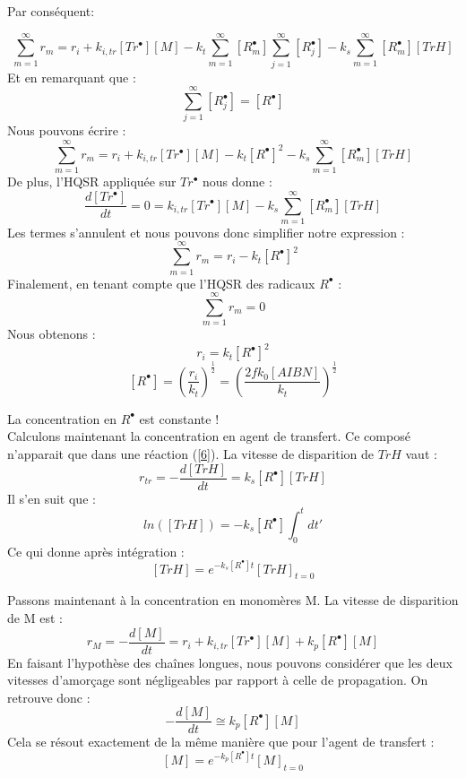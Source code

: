 \documentclass[a4paper,oneside,12pt]{article}
\begin{document}
Par conséquent:

$$\sum\limits_{m=1}^\infty r_{m}=r_i+ k_{i,tr}[Tr^{\bullet}][M] -k_{t}\sum\limits_{m=1}^\infty [R_m^{\bullet}] \sum\limits_{j=1}^\infty[R_j^{\bullet}]-k_{s}\sum\limits_{m=1}^\infty[R_{m}^{\bullet}][TrH]$$
Et en remarquant que :
$$\sum\limits_{j=1}^\infty[R_j^{\bullet}] = [R^{\bullet}]$$
Nous pouvons écrire :
$$\sum\limits_{m=1}^\infty r_{m}=r_i+ k_{i,tr}[Tr^{\bullet}][M] -k_{t}[R^{\bullet}]^2-k_{s}\sum\limits_{m=1}^\infty[R_{m}^{\bullet}][TrH]$$
De plus, l'HQSR appliquée sur $Tr^{\bullet}$ nous donne :
$$\frac{d[Tr^{\bullet}]}{dt}=0=k_{i,tr}[Tr^{\bullet}][M]-k_{s}\sum\limits_{m=1}^\infty[R_{m}^{\bullet}][TrH]$$
Les termes s'annulent et nous pouvons donc simplifier notre expression :
$$\sum\limits_{m=1}^\infty r_{m}=r_i-k_{t}[R^{\bullet}]^2$$
Finalement, en tenant compte que l'HQSR des radicaux $R^{\bullet}$ :
$$\sum\limits_{m=1}^\infty r_{m}=0$$
Nous obtenons :
$$r_i = k_{t}[R^{\bullet}]^2$$
$$[R^{\bullet}] = (\frac{r_i}{k_t})^{\frac{1}{2}}
		        = (\frac{2fk_0[AIBN]}{k_t})^{\frac{1}{2}}$$
		        
La concentration en $R^{\bullet}$ est constante !\\

Calculons maintenant la concentration en agent de transfert. Ce composé n'apparait que dans une réaction (\ref{6}). La vitesse de disparition de $TrH$ vaut : 
$$r_{tr}=-\frac{d[TrH]}{dt}=k_s[R^{\bullet}][TrH]$$
Il s'en suit que :
$$ln([TrH])=-k_s[R^{\bullet}]\int_{0}^t dt'$$
Ce qui donne après intégration :
$$[TrH]=e^{-k_s[R^{\bullet}]t}[TrH]_{t=0}$$


Passons maintenant à la concentration en monomères M. La vitesse de disparition de M est :
$$r_M=-\frac{d[M]}{dt}=r_{i}+k_{i,tr}[Tr^{\bullet}][M]+k_{p}[R^{\bullet}][M]$$ 
En faisant l'hypothèse des chaînes longues, nous pouvons considérer que les deux vitesses d'amorçage sont négligeables par rapport à celle de propagation. On retrouve donc :
$$-\frac{d[M]}{dt}\cong k_{p}[R^{\bullet}][M]$$ 
Cela se résout exactement de la même manière que pour l'agent de transfert :
$$[M]=e^{-k_p[R^{\bullet}]t}[M]_{t=0}$$


\end{document}
